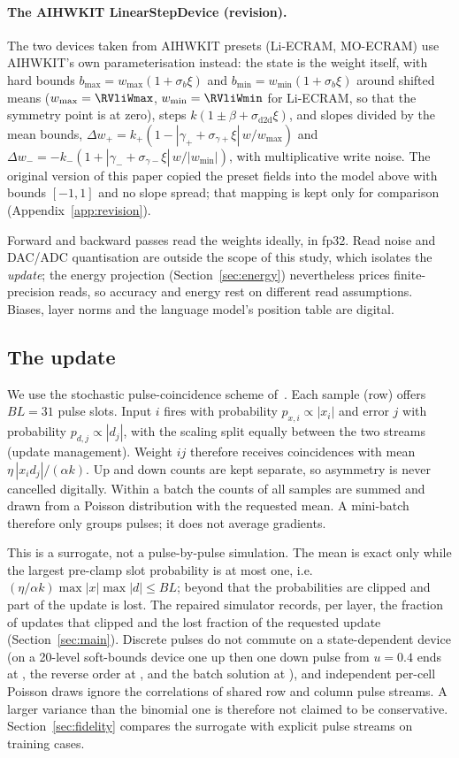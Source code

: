 \paragraph{The AIHWKIT LinearStepDevice (revision).} The two devices taken from AIHWKIT presets (Li-ECRAM, MO-ECRAM) use
AIHWKIT's own parameterisation instead: the state is the weight itself, with hard bounds $b_{\max}=w_{\max}(1+\sigma_b\xi)$ and
$b_{\min}=w_{\min}(1+\sigma_b\xi)$ around shifted means ($w_{\max}=\RVliWmax$, $w_{\min}=\RVliWmin$ for Li-ECRAM, so that the
symmetry point is at zero), steps $k(1\pm\beta+\sigma_{\mathrm{d2d}}\xi)$, and slopes divided by the mean bounds,
$\Delta w_+=k_+(1-|\gamma_++\sigma_{\gamma+}\xi|\,w/w_{\max})$ and $\Delta w_-=-k_-(1+|\gamma_-+\sigma_{\gamma-}\xi|\,w/|w_{\min}|)$,
with multiplicative write noise. The original version of this paper copied the preset fields into the model above with bounds
$[-1,1]$ and no slope spread; that mapping is kept only for comparison (Appendix~\ref{app:revision}).

Forward and backward passes read the weights ideally, in fp32. Read noise and DAC/ADC quantisation are outside the scope of this
study, which isolates the \emph{update}; the energy projection (Section~\ref{sec:energy}) nevertheless prices finite-precision
reads, so accuracy and energy rest on different read assumptions. Biases, layer norms and the language model's position
table are digital.

\subsection{The update}\label{sec:update}
We use the stochastic pulse-coincidence scheme of~\cite{gokmen2016}. Each sample (row) offers $BL=31$ pulse slots. Input $i$
fires with probability $p_{x,i}\propto|x_i|$ and error $j$ with probability $p_{d,j}\propto|d_j|$, with the scaling split equally
between the two streams (update management). Weight $ij$ therefore receives coincidences with mean
$\eta\,|x_i d_j|/(\alpha k)$. Up and down counts are kept separate, so asymmetry is never cancelled digitally. Within a batch the
counts of all samples are summed and drawn from a Poisson distribution with the requested mean. A mini-batch therefore only
groups pulses; it does not average gradients.

This is a surrogate, not a pulse-by-pulse simulation. The mean is exact only while the largest pre-clamp slot probability is at
most one, i.e.\ $(\eta/\alpha k)\max|x|\max|d|\le BL$; beyond that the probabilities are clipped and part of the update is lost.
The repaired simulator records, per layer, the fraction of updates that clipped and the lost fraction of the requested update
(Section~\ref{sec:main}). Discrete pulses do not commute on a state-dependent device (on a 20-level soft-bounds device one up
then one down pulse from $u=0.4$ ends at \RVorderUpDn, the reverse order at \RVorderDnUp, and the batch solution at \RVorderBatch), and independent
per-cell Poisson draws ignore the correlations of shared row and column pulse streams. A larger variance than the binomial one
is therefore not claimed to be conservative. Section~\ref{sec:fidelity} compares the surrogate with explicit pulse streams on
training cases.

